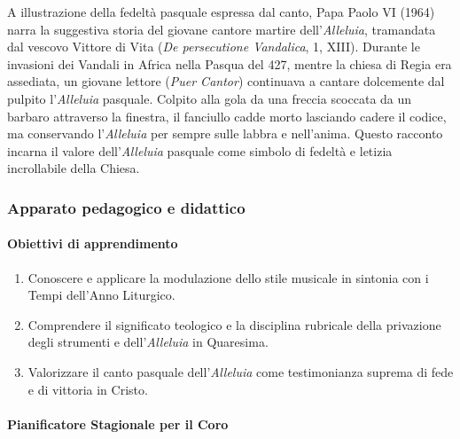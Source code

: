 \documentclass[12pt,a4paper]{article}
\begin{document}
	A illustrazione della fedeltà pasquale espressa dal canto, Papa Paolo VI (1964) narra la suggestiva storia del giovane cantore martire dell'\emph{Alleluia}, tramandata dal vescovo Vittore di Vita (\emph{De persecutione Vandalica}, 1, XIII). Durante le invasioni dei Vandali in Africa nella Pasqua del 427, mentre la chiesa di Regia era assediata, un giovane lettore (\emph{Puer Cantor}) continuava a cantare dolcemente dal pulpito l'\emph{Alleluia} pasquale. Colpito alla gola da una freccia scoccata da un barbaro attraverso la finestra, il fanciullo cadde morto lasciando cadere il codice, ma conservando l'\emph{Alleluia} per sempre sulle labbra e nell'anima. Questo racconto incarna il valore dell'\emph{Alleluia} pasquale come simbolo di fedeltà e letizia incrollabile della Chiesa.
	
	\subsubsection{Apparato pedagogico e didattico}\label{apparato-pedagogico-e-didattico-10}
	
	\paragraph{Obiettivi di apprendimento}\label{obiettivi-di-apprendimento-10}
	
	\begin{enumerate}[label=\arabic*.,leftmargin=*]
		\item Conoscere e applicare la modulazione dello stile musicale in sintonia con i Tempi dell'Anno Liturgico.
		\item Comprendere il significato teologico e la disciplina rubricale della privazione degli strumenti e dell'\emph{Alleluia} in Quaresima.
		\item Valorizzare il canto pasquale dell'\emph{Alleluia} come testimonianza suprema di fede e di vittoria in Cristo.
	\end{enumerate}
	
	\paragraph{Pianificatore Stagionale per il Coro}\label{pianificatore-stagionale-per-il-coro}
	
\end{document}
